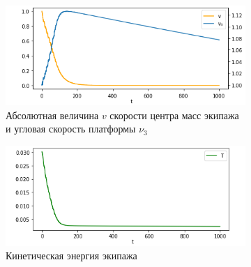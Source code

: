 \newpage


\begin{figure}[htb]
    \centering
        \begin{subfigure}[t]{\textwidth}
            \centering
            \includegraphics[width=\linewidth]{content/pic/new/impact/impact_3_vnu3.png}
            \vspace{-25pt}
            \caption{Абсолютная величина $v$ скорости центра масс экипажа и угловая скорость платформы $\nu_3$}
            \label{fig:wrench_vnu3}
        \end{subfigure}
        \begin{subfigure}[t]{\textwidth}
            \vspace{15pt}
            \centering
            \includegraphics[width=\linewidth]{content/pic/new/impact/impact_3_T.png}
            \vspace{-25pt}
            \caption{Кинетическая энергия экипажа}
            \label{fig:wrench_T}
        \end{subfigure}
        \begin{subfigure}[t]{\textwidth}
            \vspace{15pt}
            \centering

\end{subfigure}
\end{figure}
